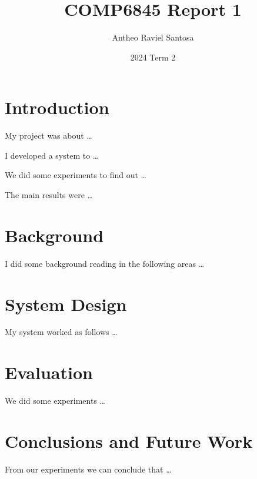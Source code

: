 \documentclass[a4paper, 11pt]{article}
\title{COMP6845 Report 1}
\author{Antheo Raviel Santosa}
\date{2024 Term 2}
\begin{document}
\maketitle
\tableofcontents

\section{Introduction}

My project was about \ldots

I developed a system to \ldots

We did some experiments to find out \ldots

The main results were \ldots

\pagebreak

\section{Background}

I did some background reading in the following areas \ldots

\pagebreak

\section{System Design}

My system worked as follows \ldots

\pagebreak

\section{Evaluation}

We did some experiments \ldots

\pagebreak

\section{Conclusions and Future Work}

From our experiments we can conclude that \ldots


\end{document}
